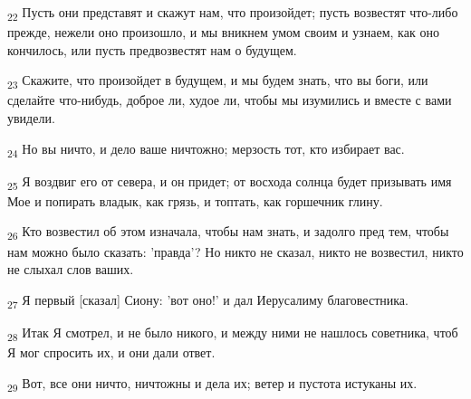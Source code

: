 \begin{tcolorbox}
\textsubscript{22} Пусть они представят и скажут нам, что произойдет; пусть возвестят что-либо прежде, нежели оно произошло, и мы вникнем умом своим и узнаем, как оно кончилось, или пусть предвозвестят нам о будущем.
\end{tcolorbox}
\begin{tcolorbox}
\textsubscript{23} Скажите, что произойдет в будущем, и мы будем знать, что вы боги, или сделайте что-нибудь, доброе ли, худое ли, чтобы мы изумились и вместе с вами увидели.
\end{tcolorbox}
\begin{tcolorbox}
\textsubscript{24} Но вы ничто, и дело ваше ничтожно; мерзость тот, кто избирает вас.
\end{tcolorbox}
\begin{tcolorbox}
\textsubscript{25} Я воздвиг его от севера, и он придет; от восхода солнца будет призывать имя Мое и попирать владык, как грязь, и топтать, как горшечник глину.
\end{tcolorbox}
\begin{tcolorbox}
\textsubscript{26} Кто возвестил об этом изначала, чтобы нам знать, и задолго пред тем, чтобы нам можно было сказать: 'правда'? Но никто не сказал, никто не возвестил, никто не слыхал слов ваших.
\end{tcolorbox}
\begin{tcolorbox}
\textsubscript{27} Я первый [сказал] Сиону: 'вот оно!' и дал Иерусалиму благовестника.
\end{tcolorbox}
\begin{tcolorbox}
\textsubscript{28} Итак Я смотрел, и не было никого, и между ними не нашлось советника, чтоб Я мог спросить их, и они дали ответ.
\end{tcolorbox}
\begin{tcolorbox}
\textsubscript{29} Вот, все они ничто, ничтожны и дела их; ветер и пустота истуканы их.
\end{tcolorbox}
